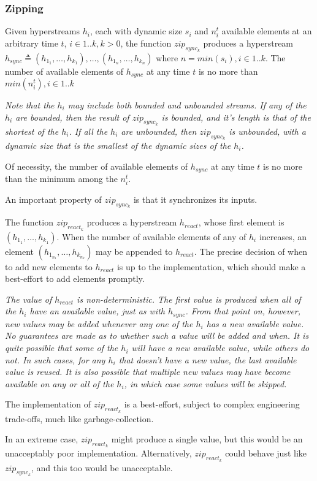 \documentclass{article}
\begin{document}
\subsubsection{Zipping}
\label{zipping}

Given hyperstreams $h_i$, each with dynamic size $s_i$ and $n_i^t$  available elements at an arbitrary time $t$, $ i \in 1..k, k > 0$, the function $zip_{sync_k}$ produces a hyperstream 
 \newline
 $h_{sync} \triangleq (h_{1_1}, \ldots, h_{k_1}), \ldots, (h_{1_n}, \ldots, h_{k_n})$ 
 \newline
 where $n = min(s_i), i \in 1..k$.
 The number of available elements of $h_{sync}$ at any time $t$ is no more than $min(n_i^t), i \in 1..k$

{\em
Note that the $h_i$ may include both bounded and unbounded streams. If any of the $h_i$ are bounded, then the result of $zip_{sync_k}$ is bounded, and it's length is that of the shortest of the $h_i$. If all  the $h_i$ are unbounded, then $zip_{sync_k}$ is unbounded, with a dynamic size that is the smallest of the dynamic sizes of the $h_i$.

Of necessity, the number of available elements of $h_{sync}$ at any time $t$ is no more than the minimum among the $n_i^t$.

An important property of $zip_{sync_k}$ is that it synchronizes its inputs.
}

The function $zip_{react_k}$  produces a hyperstream $h_{react}$, whose first element is $(h_{1_1}, \ldots, h_{k_1})$. When the number of available elements of any of $h_i$ increases, an element $(h_{1_{n_1}}, \ldots, h_{k_{n_k}})$ may be appended to $h_{react}$. The precise decision of when to add new elements to $h_{react}$ is up to the
implementation, which should make a best-effort to add elements promptly.

{\em
The value of $h_{react}$ is non-deterministic. The first value is produced when all of the $h_i$ have an available value, just as with $h_{sync}$. From that point on, however,
new values may be added whenever any one of the $h_i$ has a new available value. No guarantees are made as to whether such a value will be added and when. It is quite possible that some of the $h_i$ will have a new available value, while others do not. In such cases, for any $h_i$ that doesn't have a new value,  the last available value is reused.
It is also possible that multiple new values may have become available on any or all of the $h_i$, in which case some values will be skipped.

The implementation of $zip_{react_k}$ is a best-effort, subject to complex engineering trade-offs, much like garbage-collection.

In an extreme case, $zip_{react_k}$ might produce a single value, but this would be an unacceptably poor implementation. Alternatively, $zip_{react_k}$ could behave just like 
$zip_{sync_k}$, and this too would be unacceptable.
}
\end{document}
